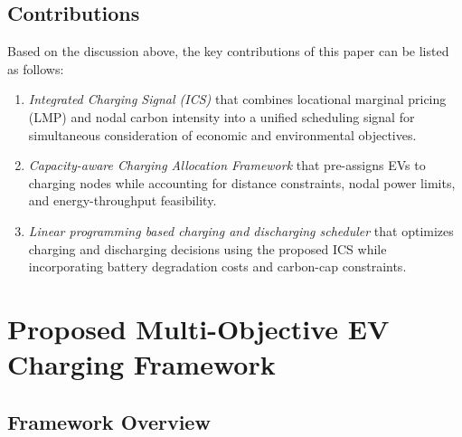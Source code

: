 \documentclass[sustainability,article,submit,moreauthors,pdftex]{Definitions/mdpi}
\begin{document}
\subsection{Contributions}

Based on the discussion above, the key contributions of this paper can be listed as follows:

\begin{enumerate}

\item \textit{Integrated Charging Signal (ICS)} that combines locational marginal pricing (LMP) and nodal carbon intensity into a unified scheduling signal for simultaneous consideration of economic and environmental objectives.

\item \textit{Capacity-aware Charging Allocation Framework} that pre-assigns EVs to charging nodes while accounting for distance constraints, nodal power limits, and energy-throughput feasibility.

\item \textit{Linear programming based charging and discharging scheduler} that optimizes charging and discharging decisions using the proposed ICS while incorporating battery degradation costs and carbon-cap constraints.

\end{enumerate}


\section{Proposed Multi-Objective EV Charging Framework}

\subsection{Framework Overview}
\end{document}
